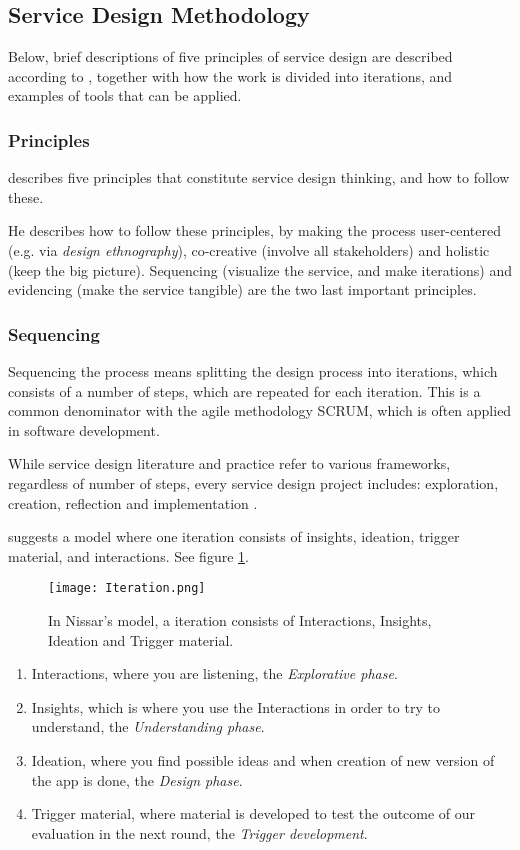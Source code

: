 \subsection{Service Design Methodology}

Below, brief descriptions of five principles of service design are described according to \cite{stickdorn}, together with how the work is divided into iterations, and examples of tools that can be applied.

\subsubsection{Principles}
\cite{stickdorn} describes five principles that constitute service design thinking, and how to follow these.

He describes how to follow these principles, by making the process user-centered (e.g. via \textit{design ethnography}), co-creative (involve all stakeholders) and holistic (keep the big picture). Sequencing (visualize the service, and make iterations) and evidencing (make the service tangible) are the two last important principles.

\subsubsection{Sequencing}
Sequencing the process means splitting the design process into iterations, which consists of a number of steps, which are repeated for each iteration. This is a common denominator with the agile methodology SCRUM, which is often applied in software development.

While service design literature and practice refer to various frameworks, regardless of number of steps, every service design project includes: exploration, creation, reflection and implementation \citep{stickdorn}.

\citep{expedition-mondial} suggests a model where one iteration consists of insights, ideation, trigger material, and interactions. See figure \ref{fig:iteration}.

\begin{figure}[h]
    \centering
    \texttt{[image: Iteration.png]}
    \caption{In Nissar's model, a iteration consists of Interactions, Insights, Ideation and Trigger material.}
    \label{fig:iteration}
\end{figure}

\begin{enumerate}
\item Interactions, where you are listening, the \textit{Explorative phase}.
\item Insights, which is where you use the Interactions in order to try to understand, the \textit{Understanding phase}. %
\item Ideation, where you find possible ideas and when creation of new version of the app is done, the \textit{Design phase}.
\item Trigger material, where material is developed to test the outcome of our evaluation in the next round, the \textit{Trigger development}.
\end{enumerate}

